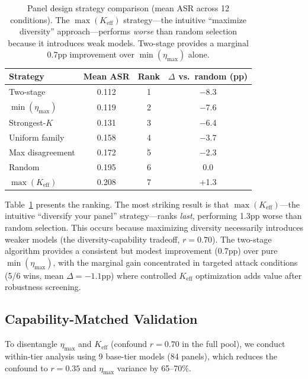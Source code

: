 \documentclass[11pt,a4paper]{article}
\begin{document}
\begin{table}[t]
\centering
\small
\begin{tabular}{lccc}
\toprule
\textbf{Strategy} & \textbf{Mean ASR} & \textbf{Rank} & \textbf{$\Delta$ vs.\ random (pp)} \\
\midrule
Two-stage & 0.112 & 1 & $-$8.3 \\
$\min(\eta_{\max})$ & 0.119 & 2 & $-$7.6 \\
Strongest-$K$ & 0.131 & 3 & $-$6.4 \\
Uniform family & 0.158 & 4 & $-$3.7 \\
Max disagreement & 0.172 & 5 & $-$2.3 \\
Random & 0.195 & 6 & 0.0 \\
$\max(K_{\text{eff}})$ & 0.208 & 7 & $+$1.3 \\
\bottomrule
\end{tabular}
\caption{Panel design strategy comparison (mean ASR across 12 conditions). The $\max(K_{\text{eff}})$ strategy---the intuitive ``maximize diversity'' approach---performs \emph{worse} than random selection because it introduces weak models. Two-stage provides a marginal 0.7pp improvement over $\min(\eta_{\max})$ alone.}
\label{tab:strategy}
\end{table}

Table~\ref{tab:strategy} presents the ranking. The most striking result is that $\max(K_{\text{eff}})$---the intuitive ``diversify your panel'' strategy---ranks \emph{last}, performing 1.3pp worse than random selection. This occurs because maximizing diversity necessarily introduces weaker models (the diversity-capability tradeoff, $r = 0.70$). The two-stage algorithm provides a consistent but modest improvement (0.7pp) over pure $\min(\eta_{\max})$, with the marginal gain concentrated in targeted attack conditions (5/6 wins, mean $\Delta = -1.1$pp) where controlled $K_{\text{eff}}$ optimization adds value after robustness screening.

\subsection{Capability-Matched Validation}
\label{sec:capability}

To disentangle $\eta_{\max}$ and $K_{\text{eff}}$ (confound $r = 0.70$ in the full pool), we conduct within-tier analysis using 9 base-tier models (84 panels), which reduces the confound to $r = 0.35$ and $\eta_{\max}$ variance by 65--70\%.
\end{document}
